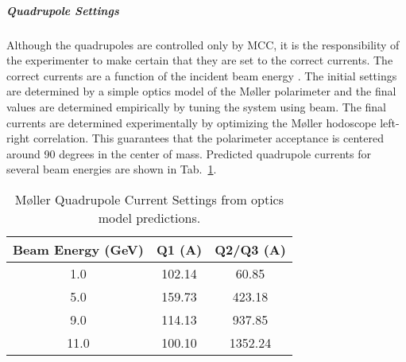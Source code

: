 {\subparagraph{Quadrupole Settings}

Although the quadrupoles are controlled only by MCC, it is the
responsibility of the experimenter to make certain that they are set
to the correct currents. The correct currents are a function of the
incident beam energy .  The initial settings are determined by a
simple optics model of the M\o ller polarimeter and the final values
are determined empirically by tuning the system using beam. The final
currents are determined experimentally by optimizing the M\o ller
hodoscope left-right correlation. This guarantees that the polarimeter
acceptance is centered around 90 degrees in the center of mass.
Predicted quadrupole currents for several beam energies are shown in
Tab.~\ref{tab_qcurrent}.

%

\begin{table}[!hbt]
\begin{center}
\begin{tabular}{|c|c|c|} \hline
Beam Energy (GeV) & Q1 (A)  & Q2/Q3 (A) \\
\hline
1.0 &  102.14 & 60.85 \\
5.0 & 159.73 & 423.18 \\
9.0 & 114.13  & 937.85 \\
11.0 & 100.10 & 1352.24 \\
\hline 
\end{tabular}
\caption{M\o ller Quadrupole Current Settings from optics model predictions.\label{tab_qcurrent}}
\end{center}
\end{table}


}
